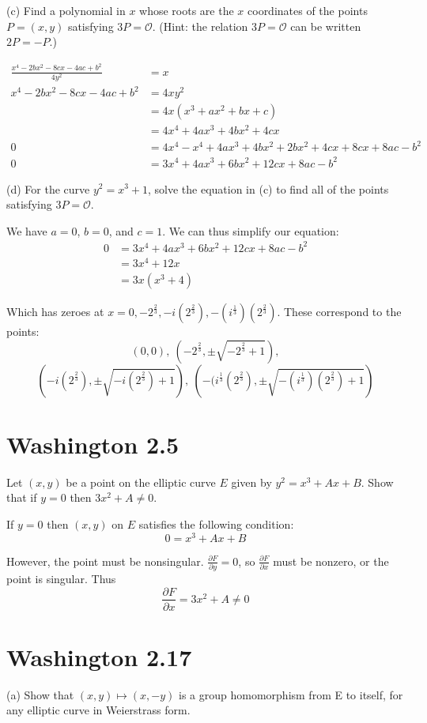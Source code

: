 \documentclass{article}
\begin{document}
(c) Find a polynomial in $x$ whose roots are the $x$ coordinates of the points $P=(x,y)$ satisfying $3P=\mathcal{O}$. (Hint: the relation $3P = \mathcal{O}$ can be written $2P = -P$.)

\begin{align*}
\frac{x^4 - 2bx^2 - 8cx - 4ac + b^2}{4y^2} &= x \\
x^4 - 2bx^2 - 8cx - 4ac + b^2 &= 4xy^2 \\
&= 4x(x^3 + ax^2 + bx + c) \\
&= 4x^4 + 4ax^3 + 4bx^2 + 4cx \\
0 &= 4x^4 - x^4 + 4ax^3 + 4bx^2 + 2bx^2 + 4cx + 8cx + 8ac - b^2 \\
0 &= 3x^4 + 4ax^3 + 6bx^2 + 12cx + 8ac - b^2
\end{align*}

(d) For the curve $y^2 = x^3 + 1$, solve the equation in (c) to find all of the points satisfying $3P = \mathcal{O}$.

We have $a = 0$, $b = 0$, and $c = 1$. We can thus simplify our equation:
\begin{align*}
0 &= 3x^4 + 4ax^3 + 6bx^2 + 12cx + 8ac - b^2 \\
&= 3x^4 + 12x \\
&= 3x(x^3 + 4)
\end{align*}

Which has zeroes at $x = 0,-2^\frac{2}{3},-i(2^\frac{2}{3}),-(i^\frac{1}{3})(2^\frac{2}{3})$. These correspond to the points:
$$(0, 0),~\left(-2^\frac{2}{3}, \pm \sqrt{-2^\frac{2}{3} + 1}\right),$$
$$\left(-i(2^\frac{2}{3}), \pm \sqrt{-i(2^\frac{2}{3}) + 1}\right),~\left(-(i^\frac{1}{3}(2^\frac{2}{3}), \pm \sqrt{-(i^\frac{1}{3})(2^\frac{2}{3}) + 1}\right)$$

\section{Washington 2.5}
Let $(x,y)$ be a point on the elliptic curve $E$ given by $y^2 = x^3 + Ax + B$. Show that if $y = 0$ then $3x^2 + A \neq 0$. 

If $y = 0$ then $(x,y)$ on $E$ satisfies the following condition:
$$0 = x^3 + Ax + B$$

However, the point must be nonsingular. $\frac{\partial F}{\partial y} = 0$, so $\frac{\partial F}{\partial x}$ must be nonzero, or the point is singular. Thus
$$\frac{\partial F}{\partial x} = 3x^2 + A \neq 0$$

\section{Washington 2.17}
(a) Show that $(x,y) \mapsto (x, -y)$ is a group homomorphism from E to itself, for any elliptic curve in Weierstrass form.
\end{document}
